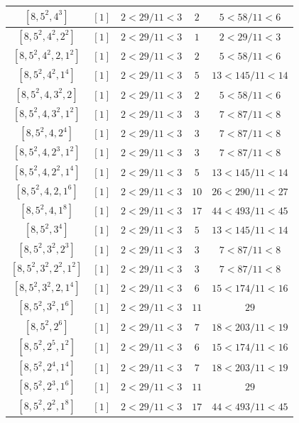 \documentclass{article}%
\begin{document}
\begin{center}
\begin{longtable}{||c|c|c|c|c||}
$[8, 5^{2}, 4^{3}]$ & $[1]$ & $2 < 29/11 < 3$ & $2$ & $5 < 58/11 < 6$ \\ \hline 
$[8, 5^{2}, 4^{2}, 2^{2}]$ & $[1]$ & $2 < 29/11 < 3$ & $1$ & $2 < 29/11 < 3$ \\ \hline 
$[8, 5^{2}, 4^{2}, 2, 1^{2}]$ & $[1]$ & $2 < 29/11 < 3$ & $2$ & $5 < 58/11 < 6$ \\ \hline 
$[8, 5^{2}, 4^{2}, 1^{4}]$ & $[1]$ & $2 < 29/11 < 3$ & $5$ & $13 < 145/11 < 14$ \\ \hline 
$[8, 5^{2}, 4, 3^{2}, 2]$ & $[1]$ & $2 < 29/11 < 3$ & $2$ & $5 < 58/11 < 6$ \\ \hline 
$[8, 5^{2}, 4, 3^{2}, 1^{2}]$ & $[1]$ & $2 < 29/11 < 3$ & $3$ & $7 < 87/11 < 8$ \\ \hline 
$[8, 5^{2}, 4, 2^{4}]$ & $[1]$ & $2 < 29/11 < 3$ & $3$ & $7 < 87/11 < 8$ \\ \hline 
$[8, 5^{2}, 4, 2^{3}, 1^{2}]$ & $[1]$ & $2 < 29/11 < 3$ & $3$ & $7 < 87/11 < 8$ \\ \hline 
$[8, 5^{2}, 4, 2^{2}, 1^{4}]$ & $[1]$ & $2 < 29/11 < 3$ & $5$ & $13 < 145/11 < 14$ \\ \hline 
$[8, 5^{2}, 4, 2, 1^{6}]$ & $[1]$ & $2 < 29/11 < 3$ & $10$ & $26 < 290/11 < 27$ \\ \hline 
$[8, 5^{2}, 4, 1^{8}]$ & $[1]$ & $2 < 29/11 < 3$ & $17$ & $44 < 493/11 < 45$ \\ \hline 
$[8, 5^{2}, 3^{4}]$ & $[1]$ & $2 < 29/11 < 3$ & $5$ & $13 < 145/11 < 14$ \\ \hline 
$[8, 5^{2}, 3^{2}, 2^{3}]$ & $[1]$ & $2 < 29/11 < 3$ & $3$ & $7 < 87/11 < 8$ \\ \hline 
$[8, 5^{2}, 3^{2}, 2^{2}, 1^{2}]$ & $[1]$ & $2 < 29/11 < 3$ & $3$ & $7 < 87/11 < 8$ \\ \hline 
$[8, 5^{2}, 3^{2}, 2, 1^{4}]$ & $[1]$ & $2 < 29/11 < 3$ & $6$ & $15 < 174/11 < 16$ \\ \hline 
$[8, 5^{2}, 3^{2}, 1^{6}]$ & $[1]$ & $2 < 29/11 < 3$ & $11$ & $29$ \\ \hline 
$[8, 5^{2}, 2^{6}]$ & $[1]$ & $2 < 29/11 < 3$ & $7$ & $18 < 203/11 < 19$ \\ \hline 
$[8, 5^{2}, 2^{5}, 1^{2}]$ & $[1]$ & $2 < 29/11 < 3$ & $6$ & $15 < 174/11 < 16$ \\ \hline 
$[8, 5^{2}, 2^{4}, 1^{4}]$ & $[1]$ & $2 < 29/11 < 3$ & $7$ & $18 < 203/11 < 19$ \\ \hline 
$[8, 5^{2}, 2^{3}, 1^{6}]$ & $[1]$ & $2 < 29/11 < 3$ & $11$ & $29$ \\ \hline 
$[8, 5^{2}, 2^{2}, 1^{8}]$ & $[1]$ & $2 < 29/11 < 3$ & $17$ & $44 < 493/11 < 45$ \\ \hline 

\end{longtable}
\end{center}
\end{document}
